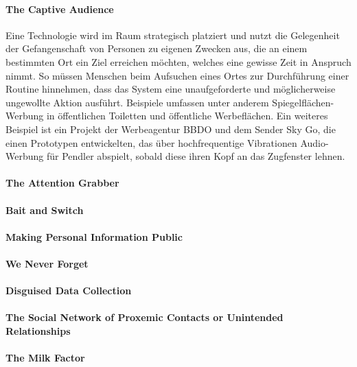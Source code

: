 \documentclass[a4paper]{article}
\begin{document}
\paragraph{The Captive Audience}
Eine Technologie wird im Raum strategisch platziert und nutzt die Gelegenheit der \glqq Gefangenschaft\grqq{} von Personen zu eigenen Zwecken aus, die an einem bestimmten Ort ein Ziel erreichen möchten, welches eine gewisse Zeit in Anspruch nimmt. So müssen Menschen beim Aufsuchen eines Ortes zur Durchführung einer Routine hinnehmen, dass das System eine unaufgeforderte und möglicherweise ungewollte Aktion ausführt.\newline
Beispiele umfassen unter anderem Spiegelflächen-Werbung in öffentlichen Toiletten und öffentliche Werbeflächen. Ein weiteres Beispiel ist ein Projekt der Werbeagentur BBDO und dem Sender Sky Go, die einen Prototypen entwickelten, das über hochfrequentige Vibrationen Audio-Werbung für Pendler abspielt, sobald diese ihren Kopf an das Zugfenster lehnen\cite{zugfenster_ad}.  

\paragraph{The Attention Grabber}

\paragraph{Bait and Switch}

\paragraph{Making Personal Information Public}

\paragraph{We Never Forget}

\paragraph{Disguised Data Collection}

\paragraph{The Social Network of Proxemic Contacts or Unintended Relationships}

\paragraph{The Milk Factor}
\end{document}
